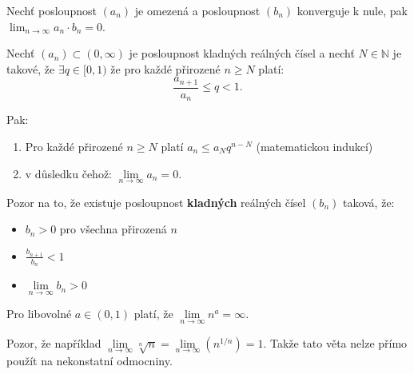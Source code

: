 \begin{theorem}
	Nechť posloupnost $(a_n)$ je omezená a posloupnost $(b_n)$ konverguje k nule, pak $\lim_{n \rightarrow \infty} a_n \cdot b_n = 0$.
	\label{thm:nasobeni_limitni_nulou}
\end{theorem}

\begin{theorem}
	Nechť $(a_n) \subset (0, \infty)$ je posloupnost kladných reálných čísel a nechť $N \in \mathbb{N}$ je takové, že $\exists q \in [0,1)$ že pro každé přirozené $n \geq N$ platí:
	$$\frac{a_{n+1}}{a_n} \leq q < 1.$$

	Pak:
	\begin{enumerate}
		\item  Pro každé přirozené $n \geq N$ platí $a_n \leq a_N q^{n - N}$ (matematickou indukcí)
		\item  v důsledku čehož: $\underset{n\rightarrow\infty}{\lim} a_n = 0$.
	\end{enumerate}

	Pozor na to, že existuje posloupnost \textbf{kladných} reálných čísel $(b_n)$ taková, že:
	\begin{itemize}
		\item  $b_n > 0$ pro všechna přirozená $n$
		\item  $\frac{b_{n+1}}{b_n} < 1$
		\item  $\underset{n\rightarrow\infty}{\lim} b_n > 0$
	\end{itemize}
	\label{thm:podilove_kriterium_o_konvergenci_k_nule}
\end{theorem}

\begin{theorem}
	Pro libovolné $a \in (0,1)$ platí, že $\underset{n\rightarrow\infty}{\lim} n^a = \infty$.

	Pozor, že například $\underset{n\rightarrow\infty}{\lim} \sqrt[n]{n} = \underset{n\rightarrow\infty}{\lim} \left( n^{1/n} \right) = 1$.
	Takže tato věta nelze přímo použít na nekonstatní odmocniny.
	\label{thm:veta_o_limite_odmocniny}
\end{theorem}

